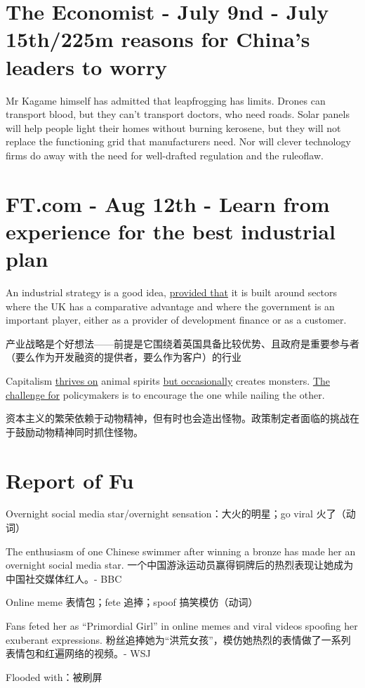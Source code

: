 \documentclass[UTF8]{ctexart}
\begin{document}
\section{The Economist - July 9nd - July 15th/225m reasons for China's leaders to worry}
Mr Kagame himself has admitted that leapfrogging has limits. Drones can transport blood, but they can’t transport doctors, who need roads. Solar panels will help people light their homes without burning kerosene, but they will not replace the functioning grid that manufacturers need. Nor will clever technology firms do away with the need for well-drafted regulation and the ruleoflaw.

\section{FT.com - Aug 12th - Learn from experience for the best industrial plan}
An industrial strategy is a good idea, \underline{provided that} it is built around sectors where the UK has a comparative advantage and where the government is an important player, either as a provider of development finance or as a customer.

产业战略是个好想法——前提是它围绕着英国具备比较优势、且政府是重要参与者（要么作为开发融资的提供者，要么作为客户）的行业

Capitalism \underline{thrives on} animal spirits \underline{but occasionally} creates monsters. \underline{The challenge for} policymakers is to encourage the one while nailing the other.

资本主义的繁荣依赖于动物精神，但有时也会造出怪物。政策制定者面临的挑战在于鼓励动物精神同时抓住怪物。

\section{Report of Fu}
Overnight social media star/overnight sensation：大火的明星；go viral 火了（动词）

The enthusiasm of one Chinese swimmer after winning a bronze has made her an overnight social media star. 一个中国游泳运动员赢得铜牌后的热烈表现让她成为中国社交媒体红人。- BBC

Online meme 表情包；fete 追捧；spoof 搞笑模仿（动词）

Fans feted her as “Primordial Girl” in online memes and viral videos spoofing her exuberant expressions. 粉丝追捧她为“洪荒女孩”，模仿她热烈的表情做了一系列表情包和红遍网络的视频。- WSJ

Flooded with：被刷屏
\end{document}
